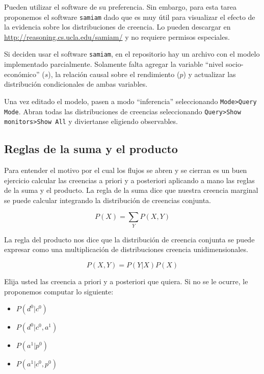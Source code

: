 \documentclass[a4paper,10pt]{article}
\begin{document}
Pueden utilizar el software de su preferencia.
Sin embargo, para esta tarea proponemos el software \texttt{samiam} dado que es muy \'util para visualizar el efecto de la evidencia sobre los distribuciones de creencia.
Lo pueden descargar en \url{http://reasoning.cs.ucla.edu/samiam/} y no requiere permisos especiales.

\vspace{0.3cm}

Si deciden usar el software \texttt{samiam}, en el repositorio hay un archivo con el modelo implementado parcialmente.
Solamente falta agregar la variable ``nivel socio-econ\'omico'' ($s$), la relaci\'on causal sobre el rendimiento ($p$) y actualizar las distribuci\'on condicionales de ambas variables.

Una vez editado el modelo, pasen a modo ``inferencia'' seleccionando \texttt{Mode>Query Mode}. Abran todas las distribuciones de creencias seleccionando \texttt{Query>Show monitors>Show All} y diviertanse eligiendo observables.

\subsection{Reglas de la suma y el producto} \label{ssec:reglas}

Para entender el motivo por el cual los flujos se abren y se cierran es un buen ejercicio calcular las creencias a priori y a posteriori aplicando a mano las reglas de la suma y el producto.
La regla de la suma dice que nuestra creencia marginal se puede calcular integrando la distribuci\'on de creencias conjunta.

\begin{equation}
 P(X) = \sum_Y P(X,Y) 
\end{equation}

La regla del producto nos dice que la distribuci\'on de creencia conjunta se puede expresar como una multiplicaci\'on de distribuciones creencia unidimensionales.

\begin{equation}
P(X,Y) = P(Y|X) P(X) 
\end{equation}

Elija usted las creencia a priori y a posteriori que quiera.
Si no se le ocurre, le proponemos computar lo siguiente:

\begin{itemize}
 \item $P(d^0|c^0)$
 \item $P(d^0|c^0,a^1)$
 \item $P(a^1|p^0)$
 \item $P(a^1|c^0,p^0)$
 \end{itemize}  
\end{document}
